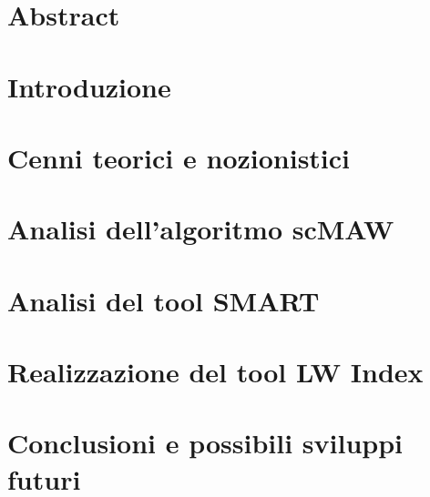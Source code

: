 \documentclass[11pt,oneside,a4paper]{book}
\begin{document}
\newpage
\thispagestyle{empty}
\begin{flushright}
\null{}
{\calligra{}}
\null
\end{flushright}


\newpage
\chapter*{}
\thispagestyle{empty}


\newpage
\thispagestyle{empty}
\begin{flushright}
\null{}
{\calligra{}}
\null
\end{flushright}

\newpage
\tableofcontents
\thispagestyle{empty}

\newpage
\fontsize{13.5}{18.5}\selectfont
\setcounter{page}{1}
\chapter*{Abstract}
    
    
\chapter{Introduzione}
    

\chapter{Cenni teorici e nozionistici}
    

\chapter{Analisi dell'algoritmo scMAW}
    

\chapter{Analisi del tool SMART}
    

\chapter{Realizzazione del tool LW Index}
    
    
\chapter{Conclusioni e possibili sviluppi futuri}
    

\printbibliography
\end{document}
